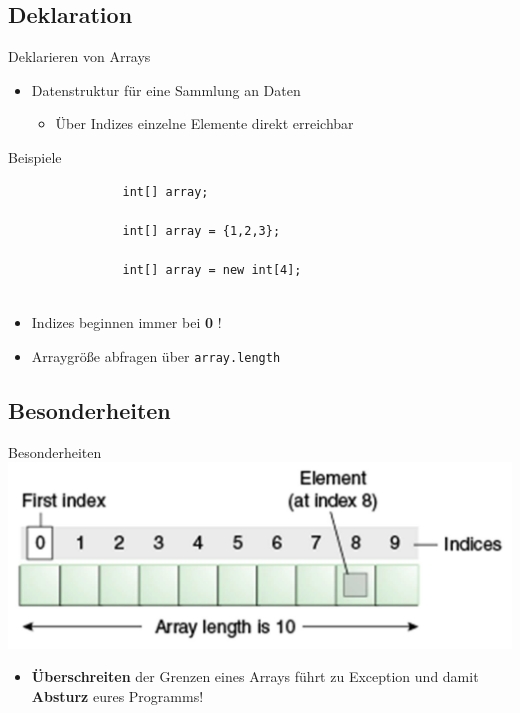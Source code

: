 \documentclass[18pt]{beamer}
\begin{document}
\subsection{Deklaration}
\begin{frame}[fragile]{Deklarieren von Arrays}
\begin{itemize}
\item Datenstruktur für eine Sammlung an Daten
\pause
\begin{itemize}
\item Über Indizes einzelne Elemente direkt erreichbar
\pause
\end{itemize}
\end{itemize}
\begin{exampleblock}{Beispiele}
	\begin{lstlisting}
				int[] array;
				
				int[] array = {1,2,3};
				
				int[] array = new int[4];
				
	\end{lstlisting}
\end{exampleblock}
\pause
\begin{itemize}
\item Indizes beginnen immer bei \textbf{ 0} !
\pause
\item Arraygröße abfragen über \lstinline{array.length}
\end{itemize}
\end{frame}

\subsection{Besonderheiten}
\begin{frame}[fragile]{Besonderheiten}
\includegraphics[width=\textwidth]{array.png}
\begin{itemize}
	\item \textbf{Überschreiten} der Grenzen eines Arrays führt zu Exception und damit \textbf{Absturz} eures Programms!
\end{itemize}
\end{frame}
\end{document}
